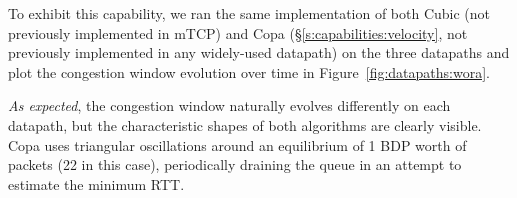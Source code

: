 To exhibit this capability, we ran the same implementation of both Cubic (not previously implemented in mTCP) and Copa (\S\ref{s:capabilities:velocity}, not previously implemented in any widely-used datapath) on the three datapaths and plot the congestion window evolution over time in Figure~\ref{fig:datapaths:wora}.

\textit{As expected}, the congestion window naturally evolves differently on each datapath, but the characteristic shapes of both algorithms are clearly visible. Copa uses triangular oscillations around an equilibrium of 1 BDP worth of packets (22 in this case), periodically draining the queue in an attempt to estimate the minimum RTT.